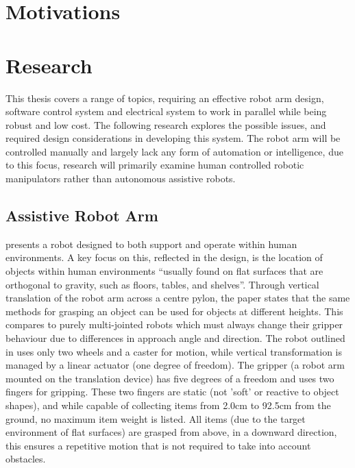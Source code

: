 \documentclass[11pt]{article} %
\begin{document}
\section{Motivations}


\section{Research}
This thesis covers a range of topics, requiring an effective robot arm design, software control system and electrical system to work in parallel while being robust and low cost. The following research explores the possible issues, and required design considerations in developing this system.
The robot arm will be controlled manually and largely lack any form of automation or intelligence, due to this focus, research will primarily examine human controlled robotic manipulators rather than autonomous assistive robots.

\subsection{Assistive Robot Arm}
\cite{nguyen2008assistive} presents a robot designed to both support and operate within human environments. A key focus on this, reflected in the design, is the location of objects within human environments ``usually found on flat surfaces that are orthogonal to gravity, such as floors, tables, and shelves''. Through vertical translation of the robot arm across a centre pylon, the paper states that the same methods for grasping an object can be used for objects at different heights. This compares to purely multi-jointed robots which must always change their gripper behaviour due to differences in approach angle and direction.
The robot outlined in \cite{nguyen2008assistive} uses only two wheels and a caster for motion, while vertical transformation is managed by a linear actuator (one degree of freedom).
The gripper (a robot arm mounted on the translation device) has five degrees of a freedom and uses two fingers for gripping. These two fingers are static (not 'soft' or reactive to object shapes), and while capable of collecting items from 2.0cm to 92.5cm from the ground, no maximum item weight is listed.
All items (due to the target environment of flat surfaces) are grasped from above, in a downward direction, this ensures a repetitive motion that is not required to take into account obstacles.
\end{document}
